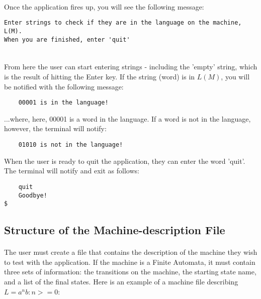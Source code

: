 \documentclass[12pt]{article}
\begin{document}
\paragraph{}
Once the application fires up, you will see the following message:

\begin{verbatim}
Enter strings to check if they are in the language on the machine, L(M).
When you are finished, enter 'quit'
    
\end{verbatim}

\paragraph{}
From here the user can start entering strings - including the 'empty' string, which is the 
result of hitting the Enter key.  If the string (word) is in $L(M)$, you will be notified 
with the following message:

\begin{verbatim}
    00001 is in the language!
\end{verbatim}

...where, here, 00001 is a word in the language.  If a word is not in the language, however,
the terminal will notify:

\begin{verbatim}
    01010 is not in the language!
\end{verbatim}

When the user is ready to quit the application, they can enter the word 'quit'.  The terminal 
will notify and exit as follows:

\begin{verbatim}
    quit
    Goodbye!
$     
\end{verbatim}

\subsection{Structure of the Machine-description File}
\paragraph{}
The user must create a file that contains the description of the machine they wish to test 
with the application.  If the machine is a Finite Automata, it must contain three sets of 
information: the transitions on the machine, the starting state name, and a list of the final 
states.  Here is an example of a machine file describing $L = {a^nb: n >= 0}$:
\end{document}
